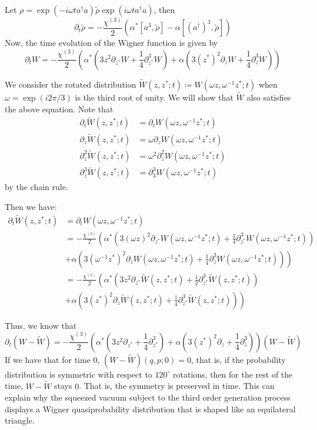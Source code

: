 \documentclass{article}
\newcommand*{\wigner}{W(\omega z, \omega^{-1}z^{*};t)}
\begin{document}
Let $\rho=\exp(-i\omega ta^{\dag}a)\tilde{\rho}\exp(i\omega ta^{\dag}a)$, then
\[\partial_{t}\tilde{\rho}=-\frac{\chi^{(3)}}{2}(\alpha^{*}[a^{3},\tilde{\rho}]-\alpha[(a^{\dag})^{3},\tilde{\rho}])\]
Now, the time evolution of the Wigner function is given by
\[\partial_{t}W=-\frac{\chi^{(3)}}{2}\left(\alpha^{*}\left(3z^{2}\partial_{z^{*}}W+\frac{1}{4}\partial_{z^{*}}^{3}W\right)+\alpha\left(3(z^{*})^{2}\partial_{z}W+\frac{1}{4}\partial_{z}^{3}W\right)\right)\]

We consider the rotated distribution $\tilde{W}(z,z^{*};t)\coloneq W(\omega z, \omega^{-1}z^{*};t)$ when $\omega=\exp(i2\pi/3)$ is the third root of unity.
We will show that $\tilde{W}$ also satisfies the above equation.
Note that
\begin{align*}
  \partial_{t}\tilde{W}(z,z^{*};t)     & =\partial_{t}\wigner               \\
  \partial_{z}\tilde{W}(z,z^{*};t)     & =\omega\partial_{z}\wigner         \\
  \partial_{z}^{2}\tilde{W}(z,z^{*};t) & =\omega^{2}\partial_{z}^{2}\wigner \\
  \partial_{z}^{3}\tilde{W}(z,z^{*};t) & =\partial_{3}^{3}\wigner
\end{align*}
by the chain rule.

Then we have:
\begin{align*}
  \partial_{t}\tilde{W}(z,z^{*};t) & =\partial_{t}\wigner                                                                                                                                      \\
                                   & =-\frac{\chi^{(3)}}{2}\left( \alpha^{*}\left( 3(\omega z)^{2}\partial_{z^{*}}\wigner+\frac{1}{4}\partial_{z^{*}}^{3}\wigner\right)\right.                 \\
                                   & \left.+\alpha\left(3(\omega^{-1}z^{*})^{2}\partial_{z}\wigner+\frac{1}{4}\partial_{z}^{3}\wigner\right)\right)                                            \\
                                   & =-\frac{\chi^{(3)}}{2}\left( \alpha^{*}\left(3z^{2}\partial_{z^{*}}\tilde{W}(z,z^{*};t)+\frac{1}{2}\partial_{z^{*}}^{3}\tilde{W}(z,z^{*};t)\right)\right. \\
                                   & \left.+\alpha\left( 3(z^{*})^{2}\partial_{z}\tilde{W}(z,z^{*};t)+\frac{1}{4}\partial_{z^{*}}^{3}\tilde{W}(z,z^{*};t)\right)\right)
\end{align*}

Thus, we know that
\[\partial_{t}(W-\tilde{W})=-\frac{\chi^{(3)}}{2}\left(\alpha^{*}\left(3z^{2}\partial_{z^{*}}+\frac{1}{4}\partial_{z^{*}}^{3}\right)+\alpha\left(3(z^{*})^{2}\partial_{z}+\frac{1}{4}\partial_{z}^{3}\right)\right)(W-\tilde{W})\]
If we have that for time $0$, $(W-\tilde{W})(q,p;0)=0$, that is, if the probability distribution is symmetric with respect to $120^{\circ}$ rotations, then for the rest of the time, $W-\tilde{W}$ stays $0$. That is, the symmetry is preserved in time.
This can explain why the squeezed vacuum subject to the third order generation process displays a Wigner quasiprobability distribution that is shaped like an equilateral triangle.

\printbibliography
\end{document}
